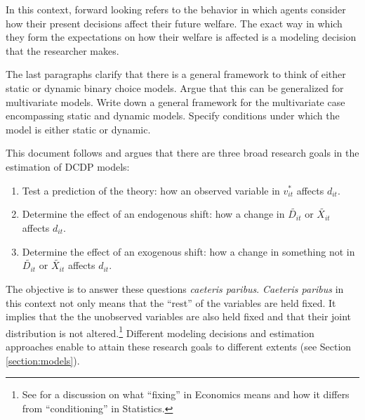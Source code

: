 \begin{remark}
In this context, forward looking refers to the behavior in which agents consider how their present decisions affect their future welfare. The exact way in which they form the expectations on how their welfare is affected is a modeling decision that the researcher makes.
\end{remark}

\begin{exercise}
The last paragraphs clarify that there is a general framework to think of either static or dynamic binary choice models. Argue that this can be generalized for multivariate models. Write down a general framework for the multivariate case encompassing static and dynamic models. Specify conditions under which the model is either static or dynamic.
\end{exercise}

\indent This document follows \citet{keane2011structural} and argues that there are three broad research goals in the estimation of DCDP models:
\begin{enumerate}
\item Test a prediction of the theory: how an observed variable in $v_{it}^*$ affects $d_{it}$.
\item Determine the effect of an endogenous shift: how a change in $\tilde{D_{it}}$ or $\tilde{X_{it}}$ affects $d_{it}$.
\item Determine the effect of an exogenous shift: how a change in something not in $\tilde{D_{it}}$ or $\tilde{X_{it}}$ affects $d_{it}$.
\end{enumerate}

\indent The objective is to answer these questions \emph{caeteris paribus}. \emph{Caeteris paribus} in this context not only means that the ``rest'' of the variables are held fixed. It implies that the the unobserved variables are also held fixed and that their joint distribution is not altered.\footnote{See \citet{heckman2013causal} for a discussion on what ``fixing'' in Economics means and how it differs from ``conditioning'' in Statistics.} Different modeling decisions and estimation approaches enable to attain these research goals to different extents (see Section \ref{section:models}).